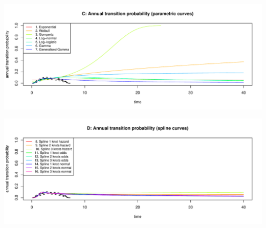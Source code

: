 \documentclass[
]{article}
\begin{document}
\begin{flushleft}\includegraphics[height=0.29\textheight]{Images/validate_extrapolation1-3} \end{flushleft}

\begin{flushleft}\includegraphics[height=0.29\textheight]{Images/validate_extrapolation1-4} \end{flushleft}
\end{document}
